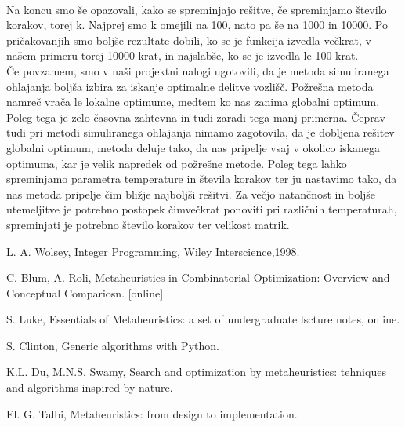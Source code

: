 \documentclass[12pt,a4paper]{amsart}
\theoremstyle{definition} %
\theoremstyle{plain} %
\begin{document}
\\
Na koncu smo še opazovali, kako se spreminjajo rešitve, če spreminjamo število korakov, torej k. Najprej smo k omejili na 100, nato pa še na 1000 in 10000. Po pričakovanjih smo boljše rezultate dobili, ko se je funkcija izvedla večkrat, v našem primeru torej 10000-krat, in najslabše, ko se je izvedla le 100-krat.\\
Če povzamem, smo v naši projektni nalogi ugotovili, da je metoda simuliranega ohlajanja boljša izbira za iskanje optimalne delitve vozlišč. Požrešna metoda namreč vrača le lokalne optimume, medtem ko nas zanima globalni optimum. Poleg tega je zelo časovna zahtevna in tudi zaradi tega manj primerna. Čeprav tudi pri metodi simuliranega ohlajanja nimamo zagotovila, da je dobljena rešitev globalni optimum, metoda deluje tako, da nas pripelje vsaj v okolico iskanega optimuma, kar je velik napredek od požrešne metode. Poleg tega lahko spreminjamo parametra temperature in števila korakov ter ju nastavimo tako, da nas metoda pripelje čim bližje najboljši rešitvi. Za večjo natančnost in boljše utemeljitve je potrebno postopek čimvečkrat ponoviti pri različnih temperaturah, spreminjati je potrebno število korakov ter velikost matrik. 

\newpage

\begin{thebibliography}{9}
L. A. Wolsey, Integer Programming, Wiley Interscience,1998. 

 
C. Blum, A. Roli, Metaheuristics in Combinatorial Optimization: Overview and Conceptual Compariosn. [online]
 
S. Luke, Essentials of Metaheuristics: a set of undergraduate lscture notes, online. 

S. Clinton, Generic algorithms with Python.

K.L. Du, M.N.S. Swamy, Search and optimization by metaheuristics: tehniques and algorithms inspired by nature. 


El. G. Talbi, Metaheuristics: from design to implementation.

\end{thebibliography}
\end{document}
